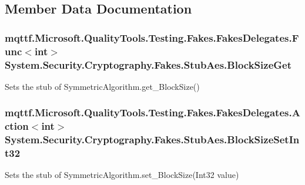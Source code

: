 \subsection{Member Data Documentation}
\hypertarget{class_system_1_1_security_1_1_cryptography_1_1_fakes_1_1_stub_aes_a05f41447a54b0f39ca2542e2b8714390}{
\subsubsection[{Block\-Size\-Get}]{\setlength{\rightskip}{0pt plus 5cm}mqttf.\-Microsoft.\-Quality\-Tools.\-Testing.\-Fakes.\-Fakes\-Delegates.\-Func$<$int$>$ System.\-Security.\-Cryptography.\-Fakes.\-Stub\-Aes.\-Block\-Size\-Get}}\label{class_system_1_1_security_1_1_cryptography_1_1_fakes_1_1_stub_aes_a05f41447a54b0f39ca2542e2b8714390}


Sets the stub of Symmetric\-Algorithm.\-get\-\_\-\-Block\-Size()

\hypertarget{class_system_1_1_security_1_1_cryptography_1_1_fakes_1_1_stub_aes_abbede7f05569bdf232861bd5a624ccbd}{
\subsubsection[{Block\-Size\-Set\-Int32}]{\setlength{\rightskip}{0pt plus 5cm}mqttf.\-Microsoft.\-Quality\-Tools.\-Testing.\-Fakes.\-Fakes\-Delegates.\-Action$<$int$>$ System.\-Security.\-Cryptography.\-Fakes.\-Stub\-Aes.\-Block\-Size\-Set\-Int32}}\label{class_system_1_1_security_1_1_cryptography_1_1_fakes_1_1_stub_aes_abbede7f05569bdf232861bd5a624ccbd}


Sets the stub of Symmetric\-Algorithm.\-set\-\_\-\-Block\-Size(\-Int32 value)

